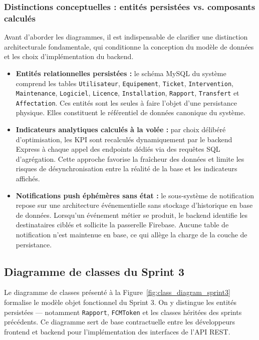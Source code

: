 \subsubsection*{Distinctions conceptuelles : entités persistées vs. composants calculés}

Avant d'aborder les diagrammes, il est indispensable de clarifier une distinction architecturale fondamentale, qui conditionne la conception du modèle de données et les choix d'implémentation du backend.

\begin{itemize}
    \item \textbf{Entités relationnelles persistées :} le schéma MySQL du système comprend les tables \texttt{Utilisateur}, \texttt{Equipement}, \texttt{Ticket}, \texttt{Intervention}, \texttt{Maintenance}, \texttt{Logiciel}, \texttt{Licence}, \texttt{Installation}, \texttt{Rapport}, \texttt{Transfert} et \texttt{Affectation}. Ces entités sont les seules à faire l'objet d'une persistance physique. Elles constituent le référentiel de données canonique du système.

    \item \textbf{Indicateurs analytiques calculés à la volée :} par choix délibéré d'optimisation, les KPI sont recalculés dynamiquement par le backend Express à chaque appel des endpoints dédiés via des requêtes SQL d'agrégation. Cette approche favorise la fraîcheur des données et limite les risques de désynchronisation entre la réalité de la base et les indicateurs affichés.

    \item \textbf{Notifications push éphémères sans état :} le sous-système de notification repose sur une architecture événementielle sans stockage d'historique en base de données. Lorsqu'un événement métier se produit, le backend identifie les destinataires ciblés et sollicite la passerelle Firebase. Aucune table de notification n'est maintenue en base, ce qui allège la charge de la couche de persistance.
\end{itemize}

\subsection{Diagramme de classes du Sprint 3}

Le diagramme de classes présenté à la Figure~\ref{fig:class_diagram_sprint3} formalise le modèle objet fonctionnel du Sprint 3. On y distingue les entités persistées — notamment \texttt{Rapport}, \texttt{FCMToken} et les classes héritées des sprints précédents. Ce diagramme sert de base contractuelle entre les développeurs frontend et backend pour l'implémentation des interfaces de l'API REST.

